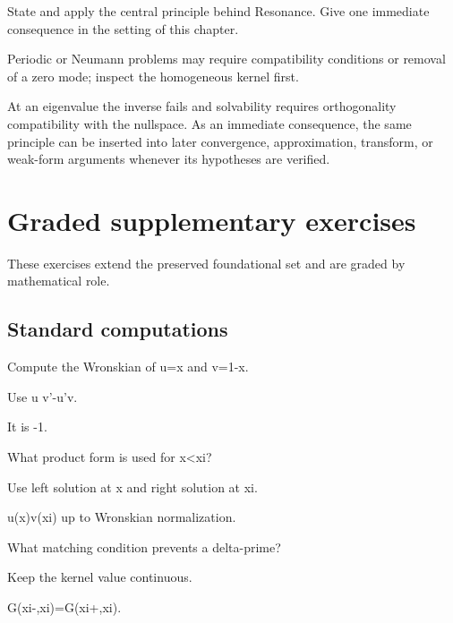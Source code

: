 \begin{exercise}\label{exr:iii26-08}
State and apply the central principle behind Resonance. Give one immediate consequence in the setting of this chapter.
\end{exercise}
\begin{hint}
Periodic or Neumann problems may require compatibility conditions or removal of a zero mode; inspect the homogeneous kernel first.
\end{hint}
\begin{solution}
At an eigenvalue the inverse fails and solvability requires orthogonality compatibility with the nullspace. As an immediate consequence, the same principle can be inserted into later convergence, approximation, transform, or weak-form arguments whenever its hypotheses are verified.
\end{solution}


\section{Graded supplementary exercises}
These exercises extend the preserved foundational set and are graded by mathematical role.

\subsection*{Standard computations}

\begin{exercise}[Wronskian]\label{exr:iii26-expand-01}
Compute the Wronskian of u=x and v=1-x.
\end{exercise}
\begin{hint}
Use u v'-u'v.
\end{hint}
\begin{solution}
It is -1.
\end{solution}

\begin{exercise}\label{exr:iii26-expand-02}
What product form is used for x<xi?
\end{exercise}
\begin{hint}
Use left solution at x and right solution at xi.
\end{hint}
\begin{solution}
u(x)v(xi) up to Wronskian normalization.
\end{solution}

\begin{exercise}[Continuity]\label{exr:iii26-expand-03}
What matching condition prevents a delta-prime?
\end{exercise}
\begin{hint}
Keep the kernel value continuous.
\end{hint}
\begin{solution}
G(xi-,xi)=G(xi+,xi).
\end{solution}

